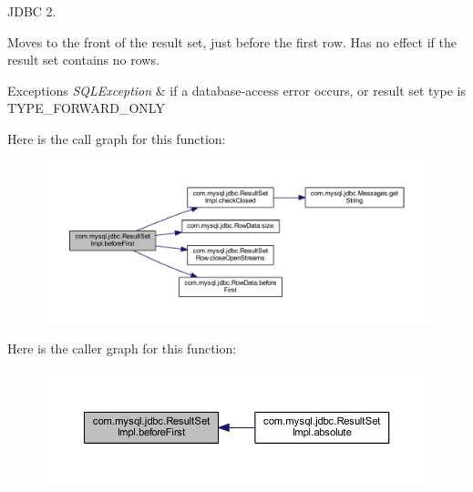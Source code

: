 J\+D\+BC 2.

Moves to the front of the result set, just before the first row. Has no effect if the result set contains no rows. 


\begin{DoxyExceptions}{Exceptions}
{\em S\+Q\+L\+Exception} & if a database-\/access error occurs, or result set type is T\+Y\+P\+E\+\_\+\+F\+O\+R\+W\+A\+R\+D\+\_\+\+O\+N\+LY \\
\hline
\end{DoxyExceptions}
Here is the call graph for this function\+:
\nopagebreak
\begin{figure}[H]
\begin{center}
\leavevmode
\includegraphics[width=350pt]{classcom_1_1mysql_1_1jdbc_1_1_result_set_impl_af1a54bdb7af316f706caf50a5819f1e9_cgraph}
\end{center}
\end{figure}
Here is the caller graph for this function\+:
\nopagebreak
\begin{figure}[H]
\begin{center}
\leavevmode
\includegraphics[width=350pt]{classcom_1_1mysql_1_1jdbc_1_1_result_set_impl_af1a54bdb7af316f706caf50a5819f1e9_icgraph}
\end{center}
\end{figure}
\mbox{\label{classcom_1_1mysql_1_1jdbc_1_1_result_set_impl_a452c11779f86bee1e87c0b8231a23dd1}} 
